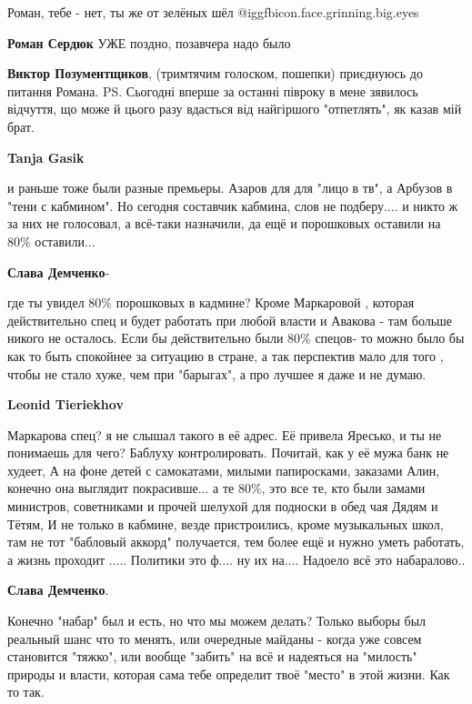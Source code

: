 \begin{itemize}
\begin{itemize}
Роман, тебе - нет, ты же от зелёных шёл  @igg{fbicon.face.grinning.big.eyes} 

\textbf{Роман Сердюк} УЖЕ поздно, позавчера надо было

\textbf{Виктор Позументщиков}, (тримтячим голоском, пошепки) приєднуюсь до питання Романа.
PS. Сьогодні вперше за останні півроку в мене зявилось відчуття, що може й цього разу вдасться від найгіршого "отпетлять", як казав мій брат.

\textbf{Tanja Gasik}
\end{itemize} %


и раньше тоже были разные премьеры. Азаров для для "лицо в тв", а Арбузов в
"тени с кабмином". Но сегодня составчик кабмина, слов не подберу.... и никто ж
за них не голосовал, а всё-таки назначили, да ещё и порошковых оставили на 80\%
оставили...

\begin{itemize} %
\textbf{Слава Демченко}- 

где ты увидел 80\% порошковых в кадмине? Кроме Маркаровой , которая
действительно спец и будет работать при любой власти и Авакова - там больше
никого не осталось. Если бы действительно были 80\% спецов- то можно было бы как
то быть спокойнее за ситуацию в стране, а так перспектив мало для того , чтобы
не стало хуже, чем при "барыгах", а про лучшее я даже и не думаю.


\textbf{Leonid Tieriekhov} 

Маркарова спец? я не слышал такого в её адрес. Её привела Яресько, и ты не
понимаешь для чего? Баблуху контролировать. Почитай, как у её мужа банк не
худеет, А на фоне детей с самокатами, милыми папиросками, заказами Алин,
конечно она выглядит покрасивше... а те 80\%, это все те, кто были замами
министров, советниками и прочей шелухой для подноски в обед чая Дядям и Тётям,
И не только в кабмине, везде пристроились, кроме музыкальных школ, там не тот
"бабловый аккорд" получается, тем более ещё и нужно уметь работать, а жизнь
проходит ..... Политики это ф.... ну их на.... Надоело всё это набаралово..

\textbf{Слава Демченко}. 

Конечно "набар" был и есть, но что мы можем делать? Только выборы был реальный
шанс что то менять, или очередные майданы - когда уже совсем становится
"тяжко", или вообще "забить" на всё и надеяться на "милость" природы и власти,
которая сама тебе определит твоё "место" в этой жизни. Как то так.


\end{itemize}
\end{itemize}
